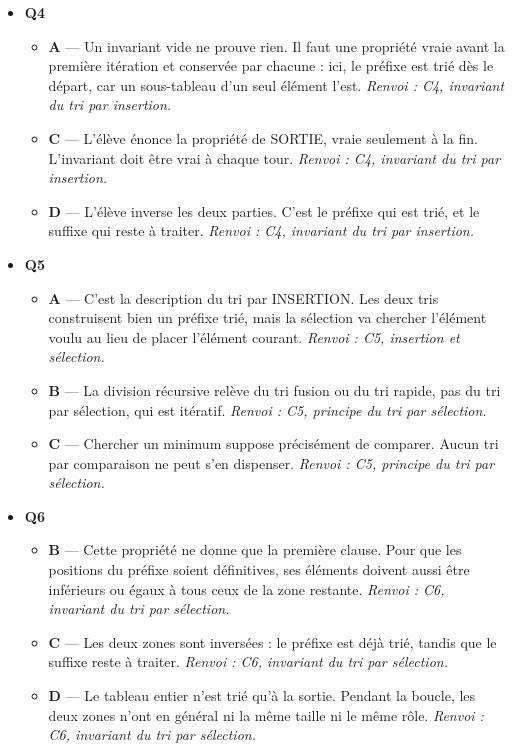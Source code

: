 \begin{itemize}
\begin{itemize}
    \item \textbf{D} — Un tri est déterministe : chaque échange répond à une comparaison, jamais au hasard. \emph{Renvoi : C3, principe du tri par insertion.}
  \end{itemize}
  \item \textbf{Q4}
  \begin{itemize}
    \item \textbf{A} — Un invariant vide ne prouve rien. Il faut une propriété vraie avant la première itération et conservée par chacune : ici, le préfixe est trié dès le départ, car un sous-tableau d'un seul élément l'est. \emph{Renvoi : C4, invariant du tri par insertion.}
    \item \textbf{C} — L'élève énonce la propriété de SORTIE, vraie seulement à la fin. L'invariant doit être vrai à chaque tour. \emph{Renvoi : C4, invariant du tri par insertion.}
    \item \textbf{D} — L'élève inverse les deux parties. C'est le préfixe qui est trié, et le suffixe qui reste à traiter. \emph{Renvoi : C4, invariant du tri par insertion.}
  \end{itemize}
  \item \textbf{Q5}
  \begin{itemize}
    \item \textbf{A} — C'est la description du tri par INSERTION. Les deux tris construisent bien un préfixe trié, mais la sélection va chercher l'élément voulu au lieu de placer l'élément courant. \emph{Renvoi : C5, insertion et sélection.}
    \item \textbf{B} — La division récursive relève du tri fusion ou du tri rapide, pas du tri par sélection, qui est itératif. \emph{Renvoi : C5, principe du tri par sélection.}
    \item \textbf{C} — Chercher un minimum suppose précisément de comparer. Aucun tri par comparaison ne peut s'en dispenser. \emph{Renvoi : C5, principe du tri par sélection.}
  \end{itemize}
  \item \textbf{Q6}
  \begin{itemize}
    \item \textbf{B} — Cette propriété ne donne que la première clause. Pour que les positions du préfixe soient définitives, ses éléments doivent aussi être inférieurs ou égaux à tous ceux de la zone restante. \emph{Renvoi : C6, invariant du tri par sélection.}
    \item \textbf{C} — Les deux zones sont inversées : le préfixe est déjà trié, tandis que le suffixe reste à traiter. \emph{Renvoi : C6, invariant du tri par sélection.}
    \item \textbf{D} — Le tableau entier n'est trié qu'à la sortie. Pendant la boucle, les deux zones n'ont en général ni la même taille ni le même rôle. \emph{Renvoi : C6, invariant du tri par sélection.}
  \end{itemize}
\end{itemize}
\fi
